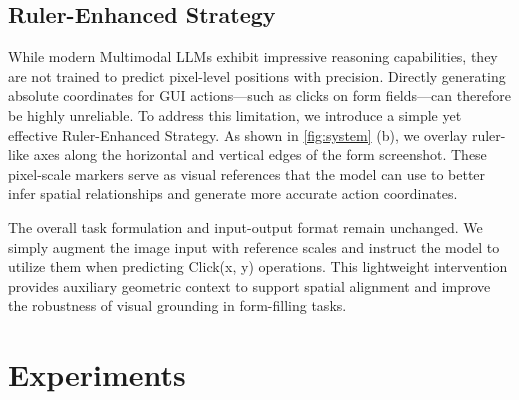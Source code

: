 \documentclass[sigconf, screen, review]{acmart}
\newcommand{\bobo}[1]{%
  \begin{CJK}{UTF8}{gbsn} %
  {\color{cyan}Bobo: #1}%
  \end{CJK}%
}
\begin{document}
\subsection{Ruler-Enhanced Strategy}

While modern Multimodal LLMs exhibit impressive reasoning capabilities, they are not trained to predict pixel-level positions with precision. Directly generating absolute coordinates for GUI actions—such as clicks on form fields—can therefore be highly unreliable.
To address this limitation, we introduce a simple yet effective Ruler-Enhanced Strategy. As shown in \cref{fig:system} (b), we overlay ruler-like axes along the horizontal and vertical edges of the form screenshot. These pixel-scale markers serve as visual references that the model can use to better infer spatial relationships and generate more accurate action coordinates.

The overall task formulation and input-output format remain unchanged. We simply augment the image input with reference scales and instruct the model to utilize them when predicting Click(x, y) operations. This lightweight intervention provides auxiliary geometric context to support spatial alignment and improve the robustness of visual grounding in form-filling tasks.





\section{Experiments}
\end{document}

